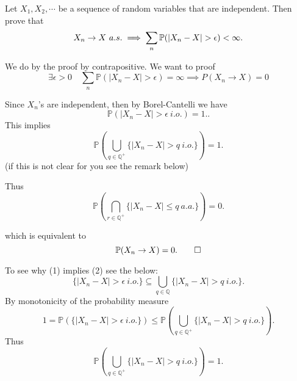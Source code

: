 \begin{problem}
	Let $ X_1,X_2,\cdots $ be a sequence of random variables that are independent. Then prove that \[ X_n \to X \ a.s. \implies \sum_n \prob(\abs{X_n-X}>\epsilon) < \infty. \]
\end{problem}
\begin{solution}
	We do by the proof by contrapositive. 
	We want to proof 
	$$ \exists \epsilon>0 \quad \sum_{n} \mathbb{P}(|X_n-X|>\epsilon) = \infty \implies P(X_n\to X) = 0 $$
	
	Since $X_n$'s are independent, then by Borel-Cantelli we have
	\[ \mathbb{P}(|X_n-X|>\epsilon\ i.o.) = 1. \tag{1}. \]
	This implies 
	\[ \mathbb{P}(\bigcup_{q\in \mathbb{Q}^+} \{|X_n-X|>q\ i.o.\}) = 1. \tag{2} \]
	(if this is not clear for you see the remark below)
	
	Thus
	$$ \mathbb{P}(\bigcap_{r\in\mathbb{Q}^+}\{|X_n-X|\leq q\ a.a.\}) = 0. $$
	
	which is equivalent to 
	$$ \mathbb{P}(X_n \to X) = 0. \qed $$
\end{solution}
\begin{remark}
	To see why (1) implies (2) see the below:
	$$\{|X_n-X|>\epsilon\ i.o.\} \subseteq \bigcup_{q\in \mathbb{Q}} \{|X_n-X|>q\ i.o.\}.$$
	By monotonicity of the probability measure
	$$ 1 = \mathbb{P}(\{|X_n-X|>\epsilon\ i.o.\}) \leq \mathbb{P}(\bigcup_{q\in \mathbb{Q}^+} \{|X_n-X|>q\ i.o.\}).$$
	Thus 
	$$ \mathbb{P}(\bigcup_{q\in \mathbb{Q}^+} \{|X_n-X|>q\ i.o.\}) = 1. $$
\end{remark}

